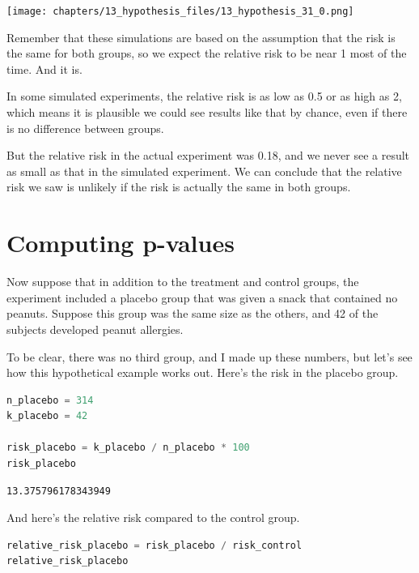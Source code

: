 \begin{center}
\texttt{[image: chapters/13\_hypothesis\_files/13\_hypothesis\_31\_0.png]}
\end{center}

Remember that these simulations are based on the assumption that the
risk is the same for both groups, so we expect the relative risk to be
near 1 most of the time. And it is.

In some simulated experiments, the relative risk is as low as 0.5 or as
high as 2, which means it is plausible we could see results like that by
chance, even if there is no difference between groups.

But the relative risk in the actual experiment was 0.18, and we never
see a result as small as that in the simulated experiment. We can
conclude that the relative risk we saw is unlikely if the risk is
actually the same in both groups.

\hypertarget{computing-p-values}{%
\section{Computing p-values}\label{computing-p-values}}

Now suppose that in addition to the treatment and control groups, the
experiment included a placebo group that was given a snack that
contained no peanuts. Suppose this group was the same size as the
others, and 42 of the subjects developed peanut allergies.

To be clear, there was no third group, and I made up these numbers, but
let's see how this hypothetical example works out. Here's the risk in
the placebo group.

\begin{lstlisting}[language=Python,style=source]
n_placebo = 314
k_placebo = 42

risk_placebo = k_placebo / n_placebo * 100
risk_placebo
\end{lstlisting}

\begin{lstlisting}[style=output]
13.375796178343949
\end{lstlisting}

And here's the relative risk compared to the control group.

\begin{lstlisting}[language=Python,style=source]
relative_risk_placebo = risk_placebo / risk_control
relative_risk_placebo
\end{lstlisting}

